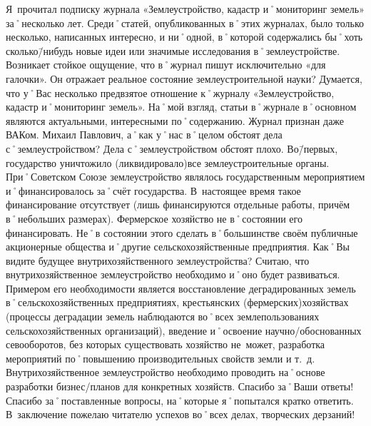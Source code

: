 \begin{drama}
	\maxspeaks Я~прочитал подписку журнала «Землеустройство, кадастр и˚мониторинг земель» за˚несколько лет. Среди˚статей, опубликованных в˚этих журналах, было только несколько, написанных интересно, и ни˚одной, в˚которой содержались бы˚хоть сколько\=/нибудь новые идеи или значимые исследования в˚землеустройстве. Возникает стойкое ощущение, что в˚журнал пишут исключительно  «для галочки». Он отражает реальное состояние землеустроительной науки?
	\michaelspeaks Думается, что у˚Вас несколько предвзятое отношение к˚журналу «Землеустройство, кадастр и˚мониторинг земель». На˚мой взгляд, статьи в˚журнале в˚основном являются актуальными, интересными по˚содержанию. Журнал признан даже ВАКом. 
	\maxspeaks Михаил Павлович, а˚как у˚нас в˚целом обстоят дела с˚землеустройством?
	\michaelspeaks Дела с˚землеустройством обстоят плохо. Во\=/первых, государство уничтожило (ликвидировало)все землеустроительные органы. При˚Советском Союзе землеустройство являлось государственным мероприятием и˚финансировалось за˚счёт государства. В~настоящее время такое финансирование отсутствует (лишь финансируются отдельные работы, причём в˚небольших размерах). Фермерское хозяйство не в˚состоянии его финансировать. Не˚в состоянии этого сделать в˚большинстве своём публичные акционерные общества и˚другие сельскохозяйственные предприятия.
	\maxspeaks Как˚Вы видите будущее внутрихозяйственного землеустройства?
	\michaelspeaks Считаю, что внутрихозяйственное землеустройство необходимо и˚оно будет развиваться. Примером его необходимости является восстановление деградированных земель в˚сельскохозяйственных предприятиях, крестьянских (фермерских)хозяйствах (процессы деградации земель наблюдаются во˚всех землепользованиях сельскохозяйственных организаций), введение и˚освоение научно\-/обоснованных севооборотов, без которых существовать хозяйство не~может, разработка мероприятий по˚повышению производительных свойств земли и т.~д. Внутрихозяйственное землеустройство необходимо проводить на˚основе разработки бизнес\-/планов для конкретных хозяйств.
	\maxspeaks Спасибо за˚Ваши ответы!
	\michaelspeaks Спасибо за˚поставленные вопросы, на˚которые я˚попытался кратко ответить. В~заключение пожелаю читателю успехов во˚всех делах, творческих дерзаний!

\end{drama}